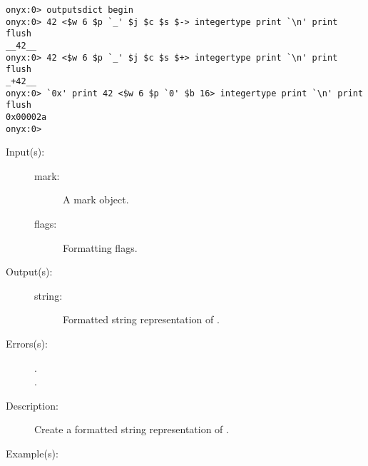 \begin{description}
\begin{description}
\begin{verbatim}
onyx:0> outputsdict begin
onyx:0> 42 <$w 6 $p `_' $j $c $s $-> integertype print `\n' print flush
__42__
onyx:0> 42 <$w 6 $p `_' $j $c $s $+> integertype print `\n' print flush
_+42__
onyx:0> `0x' print 42 <$w 6 $p `0' $b 16> integertype print `\n' print flush
0x00002a
onyx:0>
		\end{verbatim}
	\end{description}
\label{outputsdict:marktype}
\item[{\onyxop{mark flags}{marktype}{string}}: ]
	\begin{description}\item[]
	\item[Input(s): ]
		\begin{description}\item[]
		\item[mark: ]
			A mark object.
		\item[flags: ]
			Formatting flags.
		\end{description}
	\item[Output(s): ]
		\begin{description}\item[]
		\item[string: ]
			Formatted string representation of .
		\end{description}
	\item[Errors(s): ]
		\begin{description}\item[]
		\item[.]
		\item[.]
		\end{description}
	\item[Description: ]
		Create a formatted string representation of .
	\item[Example(s): ]\begin{verbatim}


\end{verbatim}
\end{description}
\end{description}
